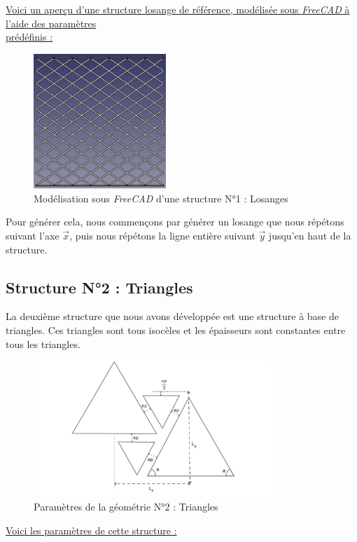 \documentclass[a4paper]{article}
\begin{document}
	\underline{Voici un aperçu d'une structure losange de référence, modélisée sous \textit{FreeCAD} à l’aide des paramètres}\\
	\underline{prédéfinis :}
	
	\begin{figure}[H]
		\centering
		\includegraphics[width=5cm]{Images/5/Freecad_losanges.png}
		\caption{Modélisation sous \textit{FreeCAD} d’une structure N°1 : Losanges}
	\end{figure}
	
	Pour générer cela, nous commençons par générer un losange que nous répétons suivant l’axe $\vec{x}$, puis nous répétons la ligne entière suivant $\vec{y}$ jusqu’en haut de la structure.
	\newpage
	
	\subsection{Structure N°2 : Triangles}
	\hspace{0.5cm}La deuxième structure que nous avons développée est une structure à base de triangles. Ces triangles sont tous isocèles et les épaisseurs sont constantes entre tous les triangles.
	
	\begin{figure}[H]
		\centering
		\includegraphics[width=9cm]{Images/5/triangle_1.pdf}
		\caption{Paramètres de la géométrie N°2 : Triangles}
	\end{figure}
	
	\underline{Voici les paramètres de cette structure :}
	
\end{document}
